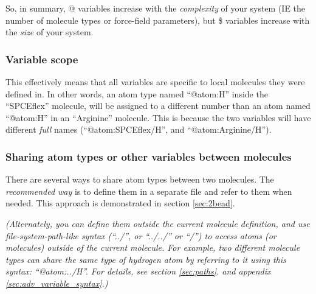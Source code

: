\documentclass[11pt]{article}
\begin{document}
So, in summary, @ variables increase with the \textit{complexity} 
of your system
(IE the number of molecule types or force-field parameters), 
but \$ variables increase with the \textit{size} of your system.

\subsubsection{Variable scope}
\label{sec:variable_scope}
This effectively means that all variables are specific to
local molecules they were defined in.
In other words, an atom type named ``@atom:H'' inside 
the ``SPCEflex'' molecule, will be assigned to a different number
than an atom named ``@atom:H'' in an ``Arginine'' molecule.
This is because the two variables will have different \textit{full} names
(``@atom:SPCEflex/H'', and ``@atom:Arginine/H'').


\subsubsection*{Sharing atom types or other variables between molecules}
There are several ways to share atom types between two molecules.
The \textit{recommended way} is to define them in a separate
file and refer to them when needed.
This approach is demonstrated in section \ref{sec:2bead}.

\textit{(Alternately, you can define them outside the current molecule definition,
and use file-system-path-like syntax 
(``../'', or ``../../'' or ``/'')
to access atoms (or molecules) outside of the current molecule.
For example, two different molecule types can share the same type of
hydrogen atom by referring to it using this syntax: ``@atom:../H''.
For details, see
section \ref{sec:paths}.
and appendix \ref{sec:adv_variable_syntax}.)
}
\end{document}
